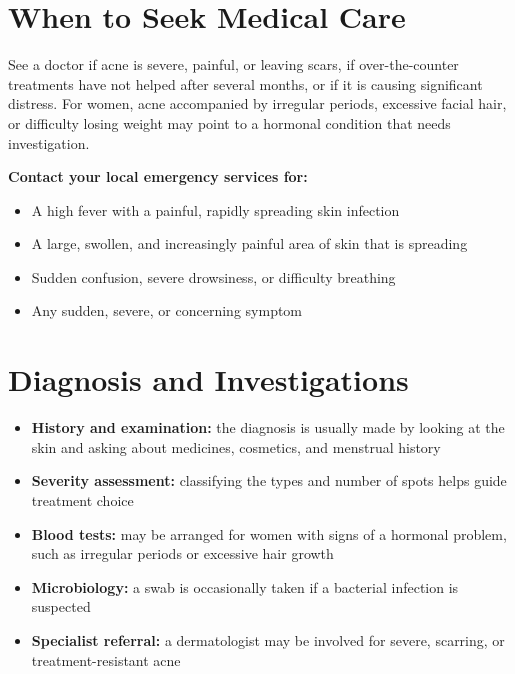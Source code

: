\section*{When to Seek Medical Care}
See a doctor if acne is severe, painful, or leaving scars, if over-the-counter treatments have not helped after several months, or if it is causing significant distress. For women, acne accompanied by irregular periods, excessive facial hair, or difficulty losing weight may point to a hormonal condition that needs investigation.

\textbf{Contact your local emergency services for:}
\begin{itemize}
    \item A high fever with a painful, rapidly spreading skin infection
    \item A large, swollen, and increasingly painful area of skin that is spreading
    \item Sudden confusion, severe drowsiness, or difficulty breathing
    \item Any sudden, severe, or concerning symptom
\end{itemize}

\section*{Diagnosis and Investigations}
\begin{itemize}
    \item \textbf{History and examination:} the diagnosis is usually made by looking at the skin and asking about medicines, cosmetics, and menstrual history
    \item \textbf{Severity assessment:} classifying the types and number of spots helps guide treatment choice
    \item \textbf{Blood tests:} may be arranged for women with signs of a hormonal problem, such as irregular periods or excessive hair growth
    \item \textbf{Microbiology:} a swab is occasionally taken if a bacterial infection is suspected
    \item \textbf{Specialist referral:} a dermatologist may be involved for severe, scarring, or treatment-resistant acne
\end{itemize}

